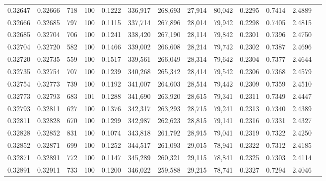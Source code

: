 \begin{tabular}{rrrrrrrrrrrrr}
0.32647 & 0.32666 &   718 & 100 &                                     0.1222 & 336,917 & 268,693 &  27,914 &  80,042 & 0.2295 & 0.7414 & 2.4889 \\
0.32666 & 0.32685 &   797 & 100 &                                     0.1115 & 337,714 & 267,896 &  28,014 &  79,942 & 0.2298 & 0.7405 & 2.4815 \\
0.32685 & 0.32704 &   706 & 100 &                                     0.1241 & 338,420 & 267,190 &  28,114 &  79,842 & 0.2301 & 0.7396 & 2.4750 \\
0.32704 & 0.32720 &   582 & 100 &                                     0.1466 & 339,002 & 266,608 &  28,214 &  79,742 & 0.2302 & 0.7387 & 2.4696 \\
0.32720 & 0.32735 &   559 & 100 &                                     0.1517 & 339,561 & 266,049 &  28,314 &  79,642 & 0.2304 & 0.7377 & 2.4644 \\
0.32735 & 0.32754 &   707 & 100 &                                     0.1239 & 340,268 & 265,342 &  28,414 &  79,542 & 0.2306 & 0.7368 & 2.4579 \\
0.32754 & 0.32773 &   739 & 100 &                                     0.1192 & 341,007 & 264,603 &  28,514 &  79,442 & 0.2309 & 0.7359 & 2.4510 \\
0.32773 & 0.32793 &   683 & 101 &                                     0.1288 & 341,690 & 263,920 &  28,615 &  79,341 & 0.2311 & 0.7349 & 2.4447 \\
0.32793 & 0.32811 &   627 & 100 &                                     0.1376 & 342,317 & 263,293 &  28,715 &  79,241 & 0.2313 & 0.7340 & 2.4389 \\
0.32811 & 0.32828 &   670 & 100 &                                     0.1299 & 342,987 & 262,623 &  28,815 &  79,141 & 0.2316 & 0.7331 & 2.4327 \\
0.32828 & 0.32852 &   831 & 100 &                                     0.1074 & 343,818 & 261,792 &  28,915 &  79,041 & 0.2319 & 0.7322 & 2.4250 \\
0.32852 & 0.32871 &   699 & 100 &                                     0.1252 & 344,517 & 261,093 &  29,015 &  78,941 & 0.2322 & 0.7312 & 2.4185 \\
0.32871 & 0.32891 &   772 & 100 &                                     0.1147 & 345,289 & 260,321 &  29,115 &  78,841 & 0.2325 & 0.7303 & 2.4114 \\
0.32891 & 0.32911 &   733 & 100 &                                     0.1200 & 346,022 & 259,588 &  29,215 &  78,741 & 0.2327 & 0.7294 & 2.4046 \\

\end{tabular}

